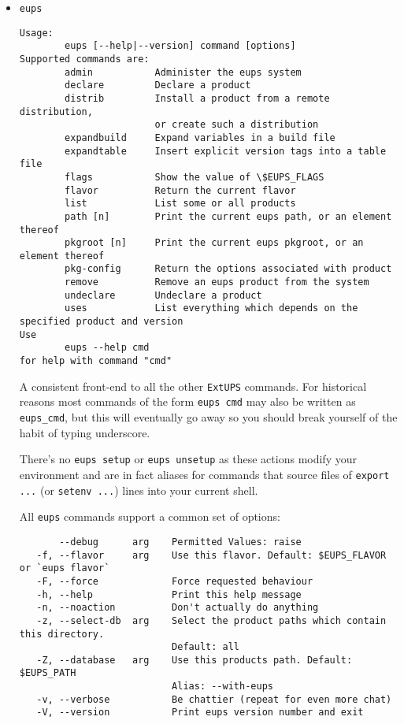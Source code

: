 \documentclass{article}
\newcommand{\code}[1]{\texttt{#1}}
\newcommand{\eups}{\code{ExtUPS}}
\begin{document}
\begin{itemize}


\item \code{eups}
\begin{verbatim}
Usage:
        eups [--help|--version] command [options]
Supported commands are:
        admin           Administer the eups system
        declare         Declare a product
        distrib         Install a product from a remote distribution,
                        or create such a distribution 
        expandbuild     Expand variables in a build file
        expandtable     Insert explicit version tags into a table file
        flags           Show the value of \$EUPS_FLAGS
        flavor          Return the current flavor
        list            List some or all products
        path [n]        Print the current eups path, or an element thereof
        pkgroot [n]     Print the current eups pkgroot, or an element thereof
        pkg-config      Return the options associated with product
        remove          Remove an eups product from the system
        undeclare       Undeclare a product
        uses            List everything which depends on the specified product and version
Use
        eups --help cmd
for help with command "cmd"
\end{verbatim}				%
  
A consistent front-end to all the other \eups{} commands.  For historical
reasons most commands of the form \code{eups cmd} may also be written as
\code{eups\_cmd}, but this will eventually go away so you should break yourself
of the habit of typing underscore.

There's no \code{eups setup} or \code{eups unsetup} as these actions
modify your environment and are in fact aliases for commands
that source files of \code{export ...} (or \code{setenv ...}) lines
into your current shell.

All \code{eups} commands support a common set of options:

\begin{verbatim}
       --debug      arg    Permitted Values: raise
   -f, --flavor     arg    Use this flavor. Default: $EUPS_FLAVOR or `eups flavor`
   -F, --force             Force requested behaviour
   -h, --help              Print this help message
   -n, --noaction          Don't actually do anything
   -z, --select-db  arg    Select the product paths which contain this directory.
                           Default: all
   -Z, --database   arg    Use this products path. Default: $EUPS_PATH
                           Alias: --with-eups
   -v, --verbose           Be chattier (repeat for even more chat)
   -V, --version           Print eups version number and exit
\end{verbatim}


\end{itemize}
\end{document}
